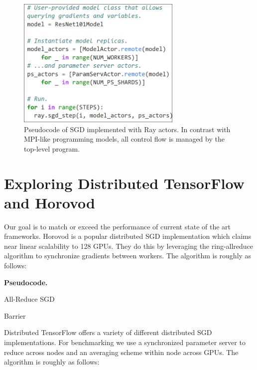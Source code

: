 \documentclass{article}
\begin{document}
\begin{figure}
    \centering
    \includegraphics[width=3.1in,keepaspectratio]{fig/pseudocode.png}
    \caption{
    \small{
        Pseudocode of SGD implemented with Ray actors. In contrast with MPI-like
        programming models, all control flow is managed by the top-level program.
    }
    }
    \label{fig:code}
\end{figure}

\section{Exploring Distributed TensorFlow and Horovod}

Our goal is to match or exceed the performance of current state of the art frameworks. Horovod is a popular distributed SGD implementation which claims near linear scalability to 128 GPUs. They do this by leveraging the ring-allreduce algorithm to synchronize gradients between workers. The algorithm is roughly as follows:

\textbf{Pseudocode.}
\begin{algorithm}
\caption{All-Reduce SGD}
 {
}
Barrier\;

 {
}


 {
}
\end{algorithm}

Distributed TensorFlow offers a variety of different distributed SGD implementations. For benchmarking we use a synchronized parameter server to reduce across nodes and an averaging scheme within node across GPUs. The algorithm is roughly as follows:
\end{document}
